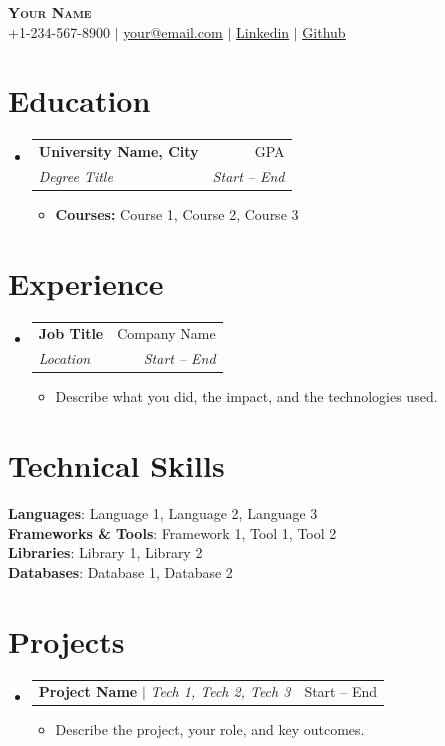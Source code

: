 \documentclass[letterpaper,11pt]{article}
\makeatletter
\newcommand{\resumeItem}[1]{
  \item\small{
    {#1 \vspace{-2pt}}
  }
}
\newcommand{\resumeSubheading}[4]{
  \vspace{-2pt}\item
    \begin{tabular*}{0.97\textwidth}[t]{l@{\extracolsep{\fill}}r}
      \textbf{#1} & #2 \\
      \textit{\small#3} & \textit{\small #4} \\
    \end{tabular*}\vspace{-7pt}
}
\newcommand{\resumeProjectHeading}[2]{
    \item
    \begin{tabular*}{0.97\textwidth}{l@{\extracolsep{\fill}}r}
      \small#1 & #2 \\
    \end{tabular*}\vspace{-7pt}
}
\newcommand{\resumeSubHeadingListStart}{\begin{itemize}[leftmargin=0.15in, label={}]}
\newcommand{\resumeSubHeadingListEnd}{\end{itemize}}
\newcommand{\resumeItemListStart}{\begin{itemize}}
\newcommand{\resumeItemListEnd}{\end{itemize}\vspace{-5pt}}
\makeatother
\begin{document}
\begin{center}
    \textbf{\Huge \scshape \textcolor{blue(pigment)}{Your Name}} \\ \vspace{7pt}
    \small +1-234-567-8900 $|$ \href{mailto:your@email.com}{\underline{your@email.com}} $|$
    \href{https://www.linkedin.com/in/yourprofile/}{\underline{Linkedin}} $|$
    \href{https://github.com/yourgithub}{\underline{Github}}
\end{center}

\section{\textcolor{blue(pigment)}{Education}}
  \resumeSubHeadingListStart
    \resumeSubheading
      {University Name, City}{GPA}
      {Degree Title}{Start -- End}
      \resumeItemListStart
        \resumeItem{\textbf{Courses:} Course 1, Course 2, Course 3}
      \resumeItemListEnd
  \resumeSubHeadingListEnd

\section{\textcolor{blue(pigment)}{Experience}}
  \resumeSubHeadingListStart
    \resumeSubheading
      {Job Title}{Company Name}
      {Location}{Start -- End}
      \resumeItemListStart
        \resumeItem{Describe what you did, the impact, and the technologies used.}
      \resumeItemListEnd
  \resumeSubHeadingListEnd

\section{\textcolor{blue(pigment)}{Technical Skills}}
 \begin{itemize}[leftmargin=0.15in, label={}]
    \small{\item{
     \textbf{Languages}{: Language 1, Language 2, Language 3} \\
     \textbf{Frameworks \& Tools}{: Framework 1, Tool 1, Tool 2} \\
     \textbf{Libraries}{: Library 1, Library 2} \\
     \textbf{Databases}{: Database 1, Database 2}
    }}
 \end{itemize}

\section{\textcolor{blue(pigment)}{Projects}}
  \resumeSubHeadingListStart
    \resumeProjectHeading
      {\textbf{Project Name} $|$ \emph{Tech 1, Tech 2, Tech 3}}{Start -- End}
      \resumeItemListStart
        \resumeItem{Describe the project, your role, and key outcomes.}
      \resumeItemListEnd
  \resumeSubHeadingListEnd
\end{document}
